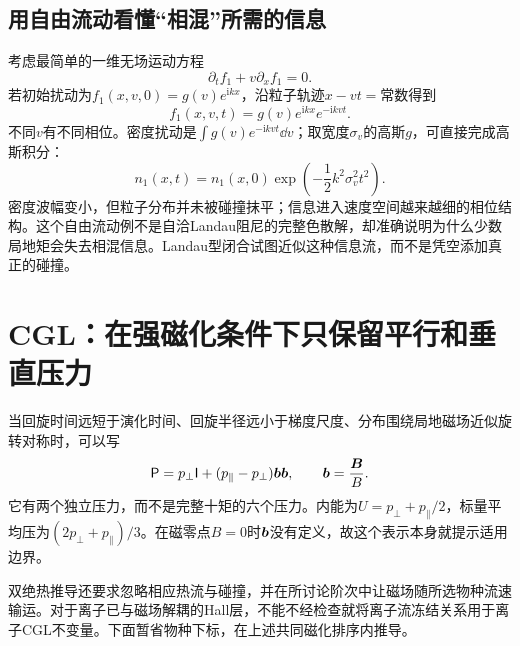 \subsection{用自由流动看懂“相混”所需的信息}
考虑最简单的一维无场运动方程
\begin{equation}\partial_tf_1+v\partial_xf_1=0.\end{equation}
若初始扰动为$f_1(x,v,0)=g(v)e^{\mathrm ikx}$，沿粒子轨迹$x-vt=\text{常数}$得到
\begin{equation}f_1(x,v,t)=g(v)e^{\mathrm ikx}e^{-\mathrm ikvt}.\end{equation}
不同$v$有不同相位。密度扰动是$\int g(v)e^{-\mathrm ikvt}\dd v$；取宽度$\sigma_v$的高斯$g$，可直接完成高斯积分：
\begin{equation}
n_1(x,t)=n_1(x,0)\exp\left(-\frac12k^2\sigma_v^2t^2\right).
\end{equation}
密度波幅变小，但粒子分布并未被碰撞抹平；信息进入速度空间越来越细的相位结构。这个自由流动例不是自洽Landau阻尼的完整色散解，却准确说明为什么少数局地矩会失去相混信息。Landau型闭合试图近似这种信息流，而不是凭空添加真正的碰撞。

\section{CGL：在强磁化条件下只保留平行和垂直压力}
当回旋时间远短于演化时间、回旋半径远小于梯度尺度、分布围绕局地磁场近似旋转对称时，可以写
\begin{equation}
\mathsf P=p_\perp\mathsf I+(p_\parallel-p_\perp)\bm{b}\bm{b},
\qquad\bm{b}=\frac{\bm{B}} B.
\label{hall:eq:gyrotropic}
\end{equation}
它有两个独立压力，而不是完整十矩的六个压力。内能为$U=p_\perp+p_\parallel/2$，标量平均压为$(2p_\perp+p_\parallel)/3$。在磁零点$B=0$时$\bm{b}$没有定义，故这个表示本身就提示适用边界。

双绝热推导还要求忽略相应热流与碰撞，并在所讨论阶次中让磁场随所选物种流速输运。对于离子已与磁场解耦的Hall层，不能不经检查就将离子流冻结关系用于离子CGL不变量。下面暂省物种下标，在上述共同磁化排序内推导。

